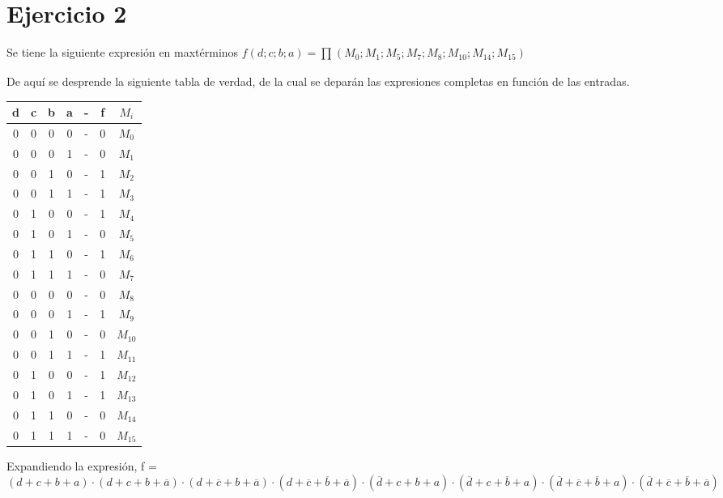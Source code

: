 \documentclass[../../informe/src/main.tex]{subfiles}
\begin{document}
	\section{Ejercicio 2}
	Se tiene la siguiente expresión en maxtérminos $f(d;c;b;a) = \prod_{}^{}(M_{0};M_{1};M_{5};M_{7};M_{8};M_{10};M_{14};M_{15})$ \par
	De aquí se desprende la siguiente tabla de verdad, de la cual se deparán las expresiones completas en función de las entradas.
	\begin{table}[H]
		\centering
 			\begin{tabular}{||c c c c c c c||} 
 				\hline
				d & c & b & a & - & f & $M_{i}$\\ [0.5ex] 
 				\hline\hline
 					0 & 0 & 0 & 0 & - & 0 & $M_{0}$ \\
 					0 & 0 & 0 & 1 & - & 0 & $M_{1}$ \\
 					0 & 0 & 1 & 0 & - & 1 & $M_{2}$ \\
 					0 & 0 & 1 & 1 & - & 1 & $M_{3}$ \\
 					0 & 1 & 0 & 0 & - & 1 & $M_{4}$ \\
 					0 & 1 & 0 & 1 & - & 0 & $M_{5}$ \\
 					0 & 1 & 1 & 0 & - & 1 & $M_{6}$ \\
 					0 & 1 & 1 & 1 & - & 0 & $M_{7}$ \\
 					0 & 0 & 0 & 0 & - & 0 & $M_{8}$ \\
 					0 & 0 & 0 & 1 & - & 1 & $M_{9}$ \\
 					0 & 0 & 1 & 0 & - & 0 & $M_{10}$ \\
 					0 & 0 & 1 & 1 & - & 1 & $M_{11}$ \\
 					0 & 1 & 0 & 0 & - & 1 & $M_{12}$ \\
 					0 & 1 & 0 & 1 & - & 1 & $M_{13}$ \\
 					0 & 1 & 1 & 0 & - & 0 & $M_{14}$ \\
 					0 & 1 & 1 & 1 & - & 0 & $M_{15}$ \\ [1ex] 
 				\hline
  	\end{tabular}
	\end{table} \par
	Expandiendo la expresión, f =$ (d+c+b+a)\cdot (d+c+b+\overline{a})\cdot (d+\overline{c}+b+\overline{a})
	\cdot (d+\overline{c}+\overline{b}+\overline{a})\cdot (\overline{d}+c+b+a)\cdot
	 (\overline{d}+c+\overline{b}+a)\cdot (\overline{d}+\overline{c}+\overline{b}+a)\cdot
	 (\overline{d}+\overline{c}+\overline{b}+\overline{a})$
\end{document}
